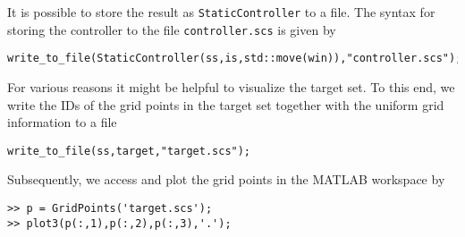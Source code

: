 \documentclass[a4paper]{amsart}
\begin{document}
It is possible to store the result as {\tt StaticController} to a file. The syntax for
storing the controller to the file {\tt controller.scs} is given by
\begin{lstlisting}[basicstyle=\small\ttfamily]
write_to_file(StaticController(ss,is,std::move(win)),"controller.scs");
\end{lstlisting}
For various reasons it might be helpful to visualize the target set. To this
end, we write the IDs of the grid points in the target set together with the
uniform grid information to a file
\begin{lstlisting}[basicstyle=\small\ttfamily]
write_to_file(ss,target,"target.scs");
\end{lstlisting}
Subsequently, we access and plot the grid points in the MATLAB workspace by
\begin{lstlisting}[basicstyle=\small\ttfamily]
>> p = GridPoints('target.scs');
>> plot3(p(:,1),p(:,2),p(:,3),'.');
\end{lstlisting}
\end{document}
